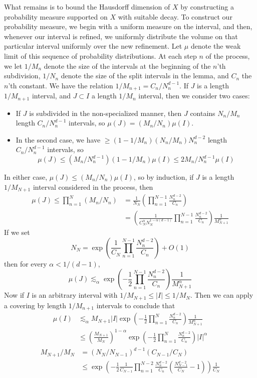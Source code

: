 \documentclass{report}
\theoremstyle{plain}
\theoremstyle{plain}
\begin{document}
What remains is to bound the Hausdorff dimension of $X$ by constructing a probability measure supported on $X$ with suitable decay. To construct our probability measure, we begin with a uniform measure on the interval, and then, whenever our interval is refined, we uniformly distribute the volume on that particular interval uniformly over the new refinement. Let $\mu$ denote the weak limit of this sequence of probability distributions. At each step $n$ of the process, we let $1/M_n$ denote the size of the intervals at the beginning of the $n$'th subdivision, $1/N_n$ denote the size of the split intervals in the lemma, and $C_n$ the $n$'th constant. We have the relation $1/M_{n+1} = C_n/N_n^{d-1}$. If $J$ is a length $1/M_{n+1}$ interval, and $J \subset I$ a length $1/M_n$ interval, then we consider two cases:
%
\begin{itemize}
        \item If $J$ is subdivided in the non-specialized manner, then $J$ contains $N_n/M_n$ length $C_n/N_n^{d-1}$ intervals, so $\mu(J) = (M_n/N_n) \mu(I)$.
        \item In the second case, we have $\geq (1 - 1/M_n)(N_n/M_n)N_n^{d-2}$ length $C_n/N_n^{d-1}$ intervals, so
        \[ \mu(J) \leq (M_n/N_n^{d-1}) (1 - 1/M_n) \mu(I) \leq 2 M_n/N_n^{d-1} \mu(I) \]
\end{itemize}
%
In either case, $\mu(J) \leq (M_n/N_n) \mu(I)$, so by induction, if $J$ is a length $1/M_{N+1}$ interval considered in the process, then
%
\begin{align*}
    \mu(J) \leq \prod_{n = 1}^N (M_n/N_n) &= \frac{1}{N_N} \left( \prod_{n = 1}^{N-1} \frac{N_n^{d-2}}{C_n} \right)\\
    &= \left( \frac{1}{C_N^\alpha N_N^{1 - \alpha(d-1)}} \prod_{n = 1}^{N-1} \frac{N_n^{d-2}}{C_n} \right) \frac{1}{M_{N+1}^\alpha}
\end{align*}
%
If we set
%
\[ N_N = \exp \left( \frac{1}{C_N} \prod_{n = 1}^{N-1} \frac{N_n^{d-2}}{C_n} \right) + O(1) \]
%
then for every $\alpha < 1/(d-1)$,
%
\[ \mu(J) \lesssim_\alpha \exp \left( - \frac{1}{2} \prod_{n = 1}^{N-1} \frac{N_n^{d-2}}{C_n} \right) \frac{1}{M_{N+1}^\alpha} \]
%
Now if $I$ is an arbitrary interval with $1/M_{N+1} \leq |I| \leq 1/M_N$. Then we can apply a covering by length $1/M_{n+1}$ intervals to conclude that
%
\begin{align*}
    \mu(I) &\lesssim_\alpha M_{N+1} |I| \exp \left( - \frac{1}{2} \prod_{n = 1}^N \frac{N_n^{d-2}}{C_n} \right) \frac{1}{M_{N+1}^\alpha}\\
    &\leq \left( \frac{M_{N+1}}{M_N} \right)^{1-\alpha} \exp \left( - \frac{1}{2} \prod_{n = 1}^N \frac{N_n^{d-2}}{C_n} \right) |I|^\alpha
\end{align*}
%
\begin{align*}
    M_{N+1}/M_N &= (N_N/N_{N-1})^{d-1}(C_{N-1}/C_N)\\
    &\leq \exp \left( - \frac{1}{2} \frac{1}{C_{N-1}} \prod_{n = 1}^{N-2} \frac{N_n^{d-2}}{C_n} \left( \frac{N_{N-1}^{d-2}}{C_N} - 1 \right) \right) \frac{1}{C_N}
\end{align*}
\end{document}
